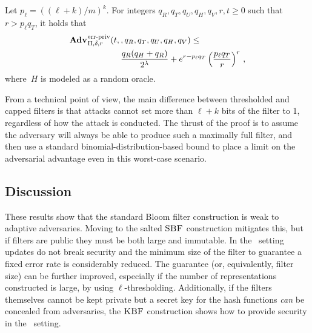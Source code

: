 \begin{theorem}
\label{thm:bf-thr-bound}
\label{thm:sbf-erreps-th}
Let $p_\ell = ((\ell+k)/m)^k$. For integers $q_R, q_T, q_U, q_H, q_V, r, t \geq 0$ such
that $r > p_\ell q_T$, it holds that
  \begin{equation*}
    \begin{aligned}
      \Adv{\erreps}_{\Pi,\delta,r}(t,\,&,q_R,q_T,q_U,q_H,q_V) \leq \\
        & \frac{q_R(q_H+q_R)}{2^\lambda} + e^{r-p_\ell q_T}\left(\frac{p_\ell q_T}{r}\right)^r
        \,,
    \end{aligned}
  \end{equation*}
  where~$H$ is modeled as a random oracle.
\end{theorem}

From a technical point of view, the main difference between thresholded and
capped filters is that attacks cannot set more than $\ell+k$ bits of the filter
to 1, regardless of how the attack is conducted. The thrust of the proof is to
assume the adversary will always be able to produce such a maximally full
filter, and then use a standard binomial-distribution-based bound to place a
limit on the adversarial advantage even in this worst-case scenario.




\subsection{Discussion}

These results show that the standard Bloom filter construction is weak to
adaptive adversaries. Moving to the salted $\textnormal{\textsc{SBF}}$ construction mitigates this,
but if filters are public they must be both large and immutable. In the \erreps\
setting updates do not break security and the minimum size of the filter to
guarantee a fixed error rate is considerably reduced. The guarantee (or,
equivalently, filter size) can be further improved, especially if the number of
representations constructed is large, by using $\ell$-thresholding.
Additionally, if the filters themselves cannot be kept private but a secret key
for the hash functions \emph{can} be concealed from adversaries, the $\textnormal{\textsc{KBF}}$
construction shows how to provide security in the \errep\ setting.

